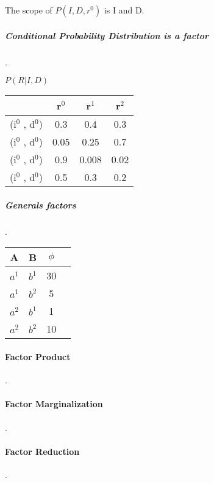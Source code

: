 The scope of $P(I,D,r^0)$ is I and D.
 
\subparagraph{Conditional Probability Distribution is a factor}.
 
 $P(R|I,D)$
 
 \begin{tabular}{c||c|c|c}
  & r$^0$ & r$^1$ & r$^2$ \\ \hline \hline
 (i$^0$ , d$^0$) & 0.3 & 0.4 & 0.3 \\ \hline
 (i$^0$ , d$^0$) & 0.05 & 0.25 & 0.7 \\ \hline
 (i$^0$ , d$^0$) & 0.9 & 0.008 & 0.02 \\ \hline
 (i$^0$ , d$^0$) & 0.5 & 0.3 & 0.2 
 \end{tabular}
 
\subparagraph{Generals factors}.
 
 \begin{tabular}{c|c|c|c}
 \hline 
A & B & $\phi$ \\ \hline 
  $a^1$ & $b^1$ &  30 \\ \hline
  $a^1$ & $b^2$ &  5 \\ \hline
  $a^2$ & $b^1$ &  1 \\ \hline
  $a^2$ & $b^2$ & 10  \\ \hline
 \end{tabular}
 
 \paragraph{Factor Product} .
 
 
 \paragraph{Factor Marginalization} .

 
 \paragraph{Factor Reduction} .
 
 

